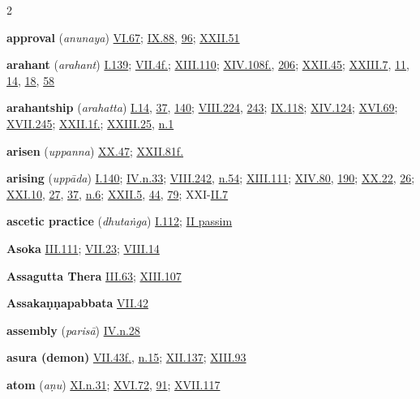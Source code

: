 \begin{multicols}{2}
\begin{vismHanging}
\par\textbf{approval} (\emph{anunaya}) \hyperlink{VI.67}{VI.67}{}; \hyperlink{IX.88}{IX.88}{}, \hyperlink{IX.96}{96}{}; \hyperlink{XXII.51}{XXII.51}{}
\par\textbf{arahant} (\emph{arahant}) \hyperlink{I.139}{I.139}{}; \hyperlink{VII.4}{VII.4f.}{}; \hyperlink{XIII.110}{XIII.110}{}; \hyperlink{XIV.108}{XIV.108f.}{}, \hyperlink{XIV.206}{206}{}; \hyperlink{XXII.45}{XXII.45}{}; \hyperlink{XXIII.7}{XXIII.7}{}, \hyperlink{XXIII.11}{11}{}, \hyperlink{XXIII.14}{14}{}, \hyperlink{XXIII.18}{18}{}, \hyperlink{XXIII.58}{58}{}
\par\textbf{arahantship} (\emph{arahatta}) \hyperlink{I.14}{I.14}{}, \hyperlink{I.37}{37}{}, \hyperlink{I.140}{140}{}; \hyperlink{VIII.224}{VIII.224}{}, \hyperlink{VIII.243}{243}{}; \hyperlink{IX.118}{IX.118}{}; \hyperlink{XIV.124}{XIV.124}{}; \hyperlink{XVI.69}{XVI.69}{}; \hyperlink{XVII.245}{XVII.245}{}; \hyperlink{XXII.1}{XXII.1f.}{}; \hyperlink{XXIII.25}{XXIII.25}{}, \hyperlink{XXIII.n1}{n.1}{}
\par\textbf{arisen} (\emph{uppanna}) \hyperlink{XX.47}{XX.47}{}; \hyperlink{XXII.81}{XXII.81f.}{}
\par\textbf{arising} (\emph{uppāda}) \hyperlink{I.140}{I.140}{}; \hyperlink{IV.n33}{IV.n.33}{}; \hyperlink{VIII.242}{VIII.242}{}, \hyperlink{VIII.n54}{n.54}{}; \hyperlink{XIII.111}{XIII.111}{}; \hyperlink{XIV.80}{XIV.80}{}, \hyperlink{XIV.190}{190}{}; \hyperlink{XX.22}{XX.22}{}, \hyperlink{XX.26}{26}{}; \hyperlink{XXI.10}{XXI.10}{}, \hyperlink{XXI.27}{27}{}, \hyperlink{XXI.37}{37}{}, \hyperlink{XXI.n6}{n.6}{}; \hyperlink{XXII.5}{XXII.5}{}, \hyperlink{XXII.44}{44}{}, \hyperlink{XXII.79}{79}{}; XXI-\hyperlink{II.7}{II.7}{}
\par\textbf{ascetic practice} (\emph{dhutaṅga}) \hyperlink{I.112}{I.112}{}; \hyperlink{II}{II passim}{}
\par\textbf{Asoka} \hyperlink{III.111}{III.111}{}; \hyperlink{VII.23}{VII.23}{}; \hyperlink{VIII.14}{VIII.14}{}
\par\textbf{Assagutta Thera} \hyperlink{III.63}{III.63}{}; \hyperlink{XIII.107}{XIII.107}{}
\par\textbf{Assakaṇṇapabbata} \hyperlink{VII.42}{VII.42}{}
\par\textbf{assembly} (\emph{parisā}) \hyperlink{IV.n28}{IV.n.28}{}
\par\textbf{asura (demon)} \hyperlink{VII.43}{VII.43f.}{}, \hyperlink{VII.n15}{n.15}{}; \hyperlink{XII.137}{XII.137}{}; \hyperlink{XIII.93}{XIII.93}{}
\par\textbf{atom} (\emph{aṇu}) \hyperlink{XI.n31}{XI.n.31}{}; \hyperlink{XVI.72}{XVI.72}{}, \hyperlink{XVI.91}{91}{}; \hyperlink{XVII.117}{XVII.117}{}

\end{vismHanging}
\end{multicols}
